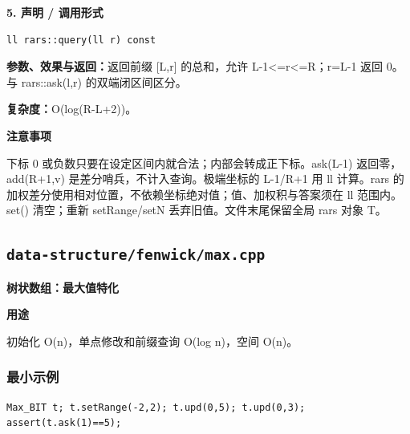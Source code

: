 \documentclass[UTF8,a4paper,10pt]{ctexart}
\newcommand{\TemplUsage}[1]{\textbf{用途}\par #1\par}
\newcommand{\TemplNote}[1]{\textbf{注意事项}\par #1\par}
\begin{document}
\noindent\begin{minipage}{\textwidth}
\textbf{5. 声明 / 调用形式}
\begin{lstlisting}
ll rars::query(ll r) const
\end{lstlisting}
\textbf{参数、效果与返回：}返回前缀 [L,r] 的总和，允许 L-1<=r<=R；r=L-1 返回 0。与 rars::ask(l,r) 的双端闭区间区分。

\textbf{复杂度：}O(log(R-L+2))。

\TemplNote{下标 0 或负数只要在设定区间内就合法；内部会转成正下标。ask(L-1) 返回零，add(R+1,v) 是差分哨兵，不计入查询。极端坐标的 L-1/R+1 用 ll 计算。rars 的加权差分使用相对位置，不依赖坐标绝对值；值、加权积与答案须在 ll 范围内。set() 清空；重新 setRange/setN 丢弃旧值。文件末尾保留全局 rars 对象 T。}
\end{minipage}\par\vspace{0.4em}
\clearpage
\subsection{\texttt{data-structure/fenwick/max.cpp}}
\textbf{树状数组：最大值特化}\par
\TemplUsage{初始化 O(n)，单点修改和前缀查询 O(log n)，空间 O(n)。}
\subsubsection*{最小示例}
\begin{lstlisting}
Max_BIT t; t.setRange(-2,2); t.upd(0,5); t.upd(0,3);
assert(t.ask(1)==5);
\end{lstlisting}
\end{document}
